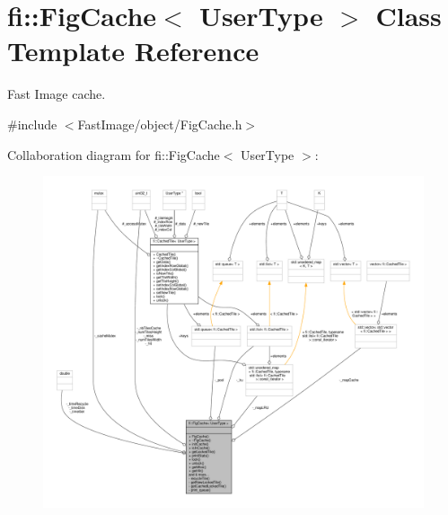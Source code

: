 \hypertarget{classfi_1_1FigCache}{}\section{fi\+:\+:Fig\+Cache$<$ User\+Type $>$ Class Template Reference}
\label{classfi_1_1FigCache}


Fast Image cache.  




{\ttfamily \#include $<$Fast\+Image/object/\+Fig\+Cache.\+h$>$}



Collaboration diagram for fi\+:\+:Fig\+Cache$<$ User\+Type $>$\+:
\nopagebreak
\begin{figure}[H]
\begin{center}
\leavevmode
\includegraphics[width=350pt]{dc/dd5/classfi_1_1FigCache__coll__graph}
\end{center}
\end{figure}
